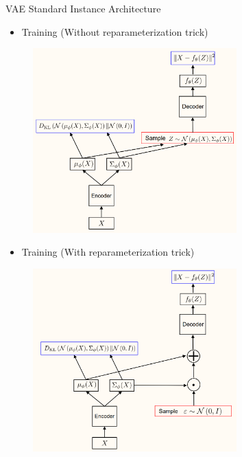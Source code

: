 \begin{frame}[allowframebreaks]

\begin{myconceptblock}{11.19}{VAE Standard Instance Architecture}
    \begin{itemize}
        \item Training (Without reparameterization trick)
    \end{itemize}

    \begin{figure}[H]
        \centering
        \includegraphics[width=0.7\textwidth]{.././assets/11.5.png}
    \end{figure}

    \begin{itemize}
        \item Training (With reparameterization trick)
    \end{itemize}

    \begin{figure}[H]
        \centering
        \includegraphics[width=0.7\textwidth]{.././assets/11.6.png}
    \end{figure}


\end{myconceptblock}
\end{frame}

